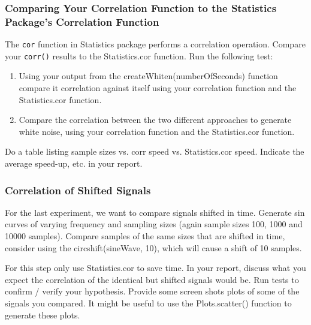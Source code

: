 \subsubsection{Comparing Your Correlation Function to the Statistics Package's Correlation Function}
The \verb|cor| function in Statistics package performs a correlation operation. Compare your \verb|corr()| results to the Statistics.cor function. Run the following test:

\begin{enumerate}
    \item Using your output from the createWhiten(numberOfSeconds) function compare it correlation against itself using your correlation function and the Statistics.cor function.
    \item Compare the correlation between the two different approaches to generate white noise, using your correlation function and the Statistics.cor function.
\end{enumerate}


Do a table listing sample sizes vs. corr speed vs. Statistics.cor speed. Indicate the average speed-up, etc. in your report.

\subsubsection{Correlation of Shifted Signals}
For the last experiment, we want to compare signals shifted in time. Generate sin curves of varying frequency and sampling sizes (again sample sizes 100, 1000 and 10000 samples). Compare samples of the same sizes that are shifted in time, consider using the circshift(sineWave, 10), which will cause a shift of 10 samples.

For this step only use Statistics.cor to save time. In your report, discuss what you expect the correlation of the identical but shifted signals would be. Run tests to confirm / verify your hypothesis. Provide some screen shots plots of some of the signals you compared. It might be useful to use the Plots.scatter() function to generate these plots.



